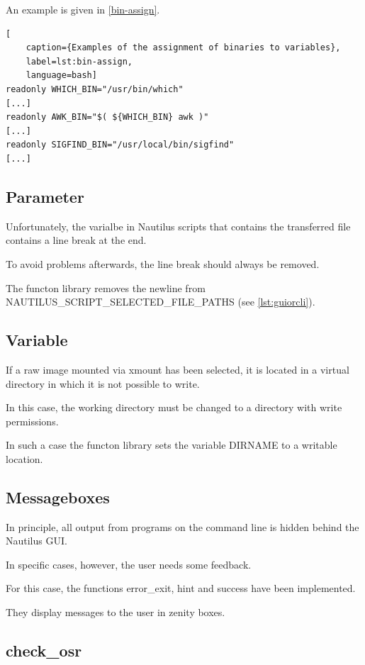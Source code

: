 An example is given in \cref{bin-assign}.

\begin{lstlisting}[
    caption={Examples of the assignment of binaries to variables},
    label=lst:bin-assign,
    language=bash]
readonly WHICH_BIN="/usr/bin/which"
[...]
readonly AWK_BIN="$( ${WHICH_BIN} awk )"
[...]
readonly SIGFIND_BIN="/usr/local/bin/sigfind"
[...]
\end{lstlisting}

\subsection{Parameter}

Unfortunately, the varialbe in Nautilus scripts that contains the transferred file contains a line break at the end.

To avoid problems afterwards, the line break should always be removed.

The functon library removes the newline from NAUTILUS\_SCRIPT\_SELECTED\_FILE\_PATHS (see \cref{lst:guiorcli}).

\subsection{Variable}

If a raw image mounted via xmount has been selected, it is located in a virtual directory in which it is not possible to write.

In this case, the working directory must be changed to a directory with write permissions.

In such a case the functon library sets the variable DIRNAME to a writable location.

\subsection{Messageboxes}

In principle, all output from programs on the command line is hidden behind the Nautilus GUI.

In specific cases, however, the user needs some feedback.

For this case, the functions error\_exit, hint and success have been implemented.

They display messages to the user in zenity boxes.

\subsection{check\_osr}

